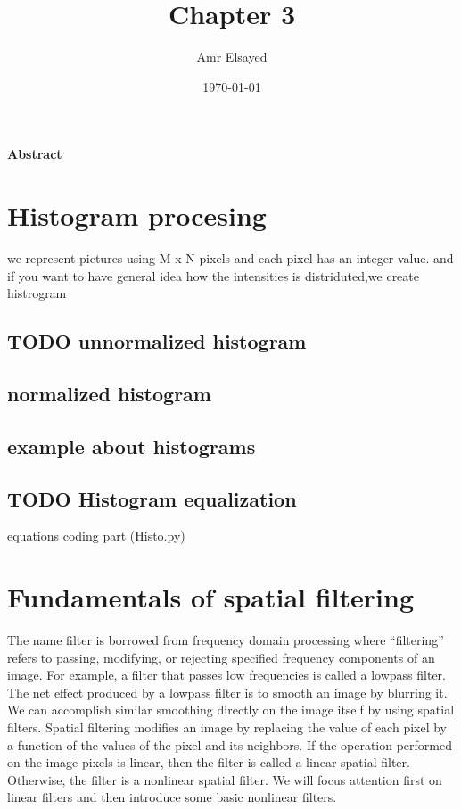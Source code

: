 \documentclass[a4paper]{article}
\affiliation{<Your school, think tank, etc>}
\author{Amr Elsayed}
\date{\today}
\title{Chapter 3}
\begin{document}
\maketitle
\tableofcontents

\begin{ABSTRACT}


\textbf{Abstract}
\end{ABSTRACT}
\tableofcontents
\section{Histogram procesing}
\label{sec:org0b15f5c}
we represent pictures using M x N pixels and each pixel has an integer value. and if you want to have general idea how the intensities is distriduted,we create histrogram
\subsection{{\bfseries\sffamily TODO} unnormalized histogram}
\label{sec:orgefc4ce4}
\subsection{normalized histogram}
\label{sec:orgc056583}
\subsection{example about histograms}
\label{sec:org113db7a}
\subsection{{\bfseries\sffamily TODO} Histogram equalization}
\label{sec:org6764ed9}
equations
coding part (Histo.py)
\section{Fundamentals of spatial filtering}
\label{sec:org6c9155f}
The name filter is borrowed from frequency domain processing where “filtering” refers to passing, modifying,
or rejecting specified frequency components of an image. For example, a filter that passes low frequencies is called a lowpass filter.
The net effect produced by a lowpass filter is to smooth an image by blurring it. We can accomplish similar smoothing directly on the
image itself by using spatial filters.
Spatial filtering modifies an image by replacing the value of each pixel by a function of the values of the pixel and its neighbors. If the
operation performed on the image pixels is linear, then the filter is called a linear spatial filter. Otherwise, the filter is a nonlinear spatial
filter. We will focus attention first on linear filters and then introduce some basic nonlinear filters. 
\end{document}
